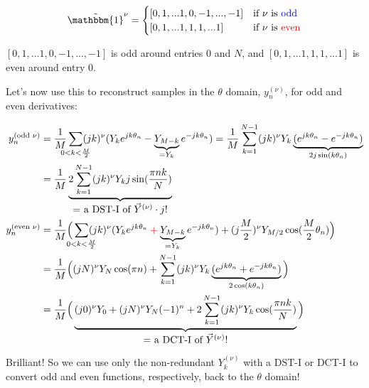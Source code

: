 \documentclass[10pt]{article}
\begin{document}
$$\tilde{\mathbbm{1}}^\nu = \begin{cases} [0, 1, ... 1, 0, -1, ..., -1] & \text{if $\nu$ is \color{blue}odd}\\ [0, 1, ... 1, 1, 1, ... 1] & \text{if $\nu$ is \color{red}even}\end{cases}$$

$[0, 1, ... 1, 0, -1, ..., -1]$ is odd around entries $0$ and $N$, and $[0, 1, ... 1, 1, 1, ... 1]$ is even around entry $0$.\newline

Let's now use this to reconstruct samples in the $\theta$ domain, $y_n^{(\nu)}$, for odd and even derivatives:\vspace{-5mm}

\begin{align}
y_n^{(\text{odd } \nu)} &= \frac{1}{M} \sum_{\mathclap{0 < k < \frac{M}{2}}} (jk)^\nu (Y_k e^{jk\theta_n} \color{blue}-\color{black} \underbrace{Y_{M-k}}_{= Y_k} e^{-jk\theta_n}) = \frac{1}{M} \sum_{k=1}^{N-1} (jk)^\nu Y_k \underbrace{(e^{jk\theta_n} - e^{-jk\theta_n})}_{2j\sin(k\theta_n)} \notag \\
&= \frac{1}{M} \underbrace{2 \sum_{k=1}^{N-1} (jk)^\nu Y_k j \sin(\frac{\pi nk}{N})}_{\text{\normalsize = a DST-I of $\vec{Y}^{(\nu)} \cdot j$!}} \label{y_prime_odd}\\
y_n^{(\text{even } \nu)} &= \frac{1}{M} \Big( \sum_{\mathclap{0 < k < \frac{M}{2}}} (jk)^\nu (Y_k e^{jk\theta_n} \color{red}+\color{black} \underbrace{Y_{M-k}}_{= Y_k} e^{-jk\theta_n}) + (j\frac{M}{2})^\nu Y_{M/2} \cos(\frac{M}{2}\theta_n) \Big) \notag \\
&= \frac{1}{M} \Big( (jN)^\nu Y_N \cos(\pi n) + \sum_{k=1}^{N-1} (jk)^\nu Y_k \underbrace{(e^{jk\theta_n} + e^{-jk\theta_n})}_{2\cos(k\theta_n)} \Big) \notag \\
&= \frac{1}{M} \Big( \underbrace{(j0)^\nu Y_0 + (jN)^\nu Y_N (-1)^n + 2 \sum_{k=1}^{N-1} (jk)^\nu Y_k \cos(\frac{\pi nk}{N})}_{\text{\normalsize = a DCT-I of $\vec{Y}^{(\nu)}$!}} \Big) \label{y_prime_even}
\end{align}

Brilliant! So we can use only the non-redundant $Y_k^{(\nu)}$ with a DST-I or DCT-I to convert odd and even functions, respectively, back to the $\theta$ domain!
\end{document}
